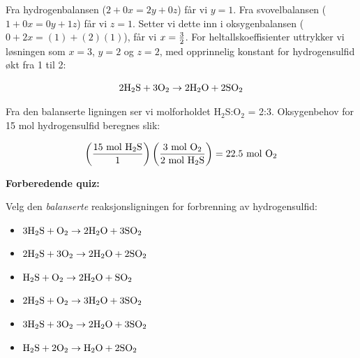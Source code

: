 Fra hydrogenbalansen ($2 + 0x = 2y + 0z$) får vi $y = 1$. Fra svovelbalansen ($1 + 0x = 0y + 1z$) får vi $z = 1$. Setter vi dette inn i oksygenbalansen ($0 + 2x = (1) + (2)(1)$), får vi $x = {3 \over 2}$. For heltallskoeffisienter uttrykker vi løsningen som $x = 3$, $y = 2$ og $z = 2$, med opprinnelig konstant for hydrogensulfid økt fra 1 til 2:

$$\hbox{2H}_2\hbox{S} + \hbox{3O}_2 \to \hbox{2H}_2\hbox{O} + \hbox{2SO}_2$$

Fra den balanserte ligningen ser vi molforholdet H$_{2}$S:O$_{2}$ = 2:3. Oksygenbehov for 15 mol hydrogensulfid beregnes slik:

$$\left({15 \hbox{ mol H}_2\hbox{S} \over 1}\right) \left({3 \hbox{ mol O}_2 \over 2 \hbox{ mol H}_2\hbox{S}}\right) = 22.5 \hbox{ mol O}_2$$









\vfil \eject

\noindent
{\bf Forberedende quiz:}

Velg den {\it balanserte} reaksjonsligningen for forbrenning av hydrogensulfid:

\begin{itemize}
\item{} $\hbox{3H}_2\hbox{S} + \hbox{O}_2 \to \hbox{2H}_2\hbox{O} + \hbox{3SO}_2$
\vskip 10pt
\item{} $\hbox{2H}_2\hbox{S} + \hbox{3O}_2 \to \hbox{2H}_2\hbox{O} + \hbox{2SO}_2$
\vskip 10pt
\item{} $\hbox{H}_2\hbox{S} + \hbox{O}_2 \to \hbox{2H}_2\hbox{O} + \hbox{SO}_2$
\vskip 10pt
\item{} $\hbox{2H}_2\hbox{S} + \hbox{O}_2 \to \hbox{3H}_2\hbox{O} + \hbox{3SO}_2$
\vskip 10pt
\item{} $\hbox{3H}_2\hbox{S} + \hbox{3O}_2 \to \hbox{2H}_2\hbox{O} + \hbox{3SO}_2$
\vskip 10pt
\item{} $\hbox{H}_2\hbox{S} + \hbox{2O}_2 \to \hbox{H}_2\hbox{O} + \hbox{2SO}_2$
\end{itemize}



